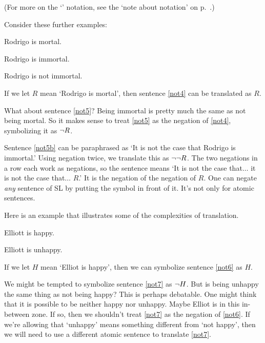 
(For more on the `\metaA{}' notation, see the `note about notation' on p.\ \pageref{notationnote}.)

Consider these further examples:
\begin{earg}
\item[\ex{not4}] Rodrigo is mortal.
\item[\ex{not5}] Rodrigo is immortal.
\item[\ex{not5b}] Rodrigo is not immortal.
\end{earg}


If we let $R$ mean `Rodrigo is mortal', then sentence \ref{not4} can be translated as $R$.

What about sentence \ref{not5}? Being immortal is pretty much the same as not being mortal. So it makes sense to treat \ref{not5} as the negation of \ref{not4}, symbolizing it as $\neg{R}$. 

Sentence \ref{not5b} can be paraphrased as `It is not the case that Rodrigo is immortal.' Using negation twice, we translate this as $\neg\neg R$. The two negations in a row each work as negations, so the sentence means `It is not the case that$\ldots$ it is not the case that$\ldots$ $R$.' It is the negation of the negation of $R$. One can negate \emph{any} sentence of SL by putting the \enot symbol in front of it. It's not only for atomic sentences.

Here is an example that illustrates some of the complexities of translation.
\begin{earg}
\item[\ex{not6}] Elliott is happy.
\item[\ex{not7}] Elliott is unhappy.
\end{earg}

If we let $H$ mean `Elliot is happy', then we can symbolize sentence \ref{not6} as $H$.

We might be tempted to symbolize sentence \ref{not7} as $\neg{H}$. But is being unhappy the same thing as not being happy? This is perhaps debatable. One might think that it is possible to be neither happy nor unhappy. Maybe Elliot is in this in-between zone. If so, then we shouldn't treat \ref{not7} as the negation of \ref{not6}. If we're allowing that `unhappy' means something different from `not happy', then we will need to use a different atomic sentence to translate \ref{not7}.

